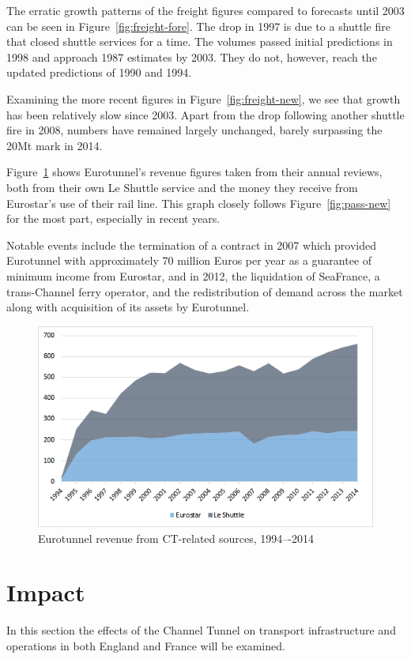 \documentclass[12pt]{article} %
\begin{document}
The erratic growth patterns of the freight figures compared to forecasts until 2003 can be seen in Figure~\ref{fig:freight-fore}. The drop in 1997 is due to a shuttle fire that closed shuttle services for a time. The volumes passed initial predictions in 1998 and approach 1987 estimates by 2003. They do not, however, reach the updated predictions of 1990 and 1994.

Examining the more recent figures in Figure~\ref{fig:freight-new}, we see that growth has been relatively slow since 2003. Apart from the drop following another shuttle fire in 2008, numbers have remained largely unchanged, barely surpassing the 20Mt mark in 2014.

Figure~\ref{fig:revenue} shows Eurotunnel's revenue figures taken from their annual reviews\cite{et-reports}, both from their own Le Shuttle service and the money they receive from Eurostar's use of their rail line. This graph closely follows Figure~\ref{fig:pass-new} for the most part, especially in recent years. 

Notable events include the termination of a contract in 2007 which provided Eurotunnel with approximately 70 million Euros per year as a guarantee of minimum income from Eurostar, and in 2012, the liquidation of SeaFrance, a trans-Channel ferry operator, and the redistribution of demand across the market along with acquisition of its assets by Eurotunnel.\cite{et-reports}

\begin{figure}[hp]
  \centering
  \includegraphics[width=\textwidth]{revenue}
  \caption{Eurotunnel revenue from CT-related sources, 1994–-2014}
  \label{fig:revenue}
\end{figure}

\section{Impact}
In this section the effects of the Channel Tunnel on transport infrastructure and operations in both England and France will be examined.
\end{document}
